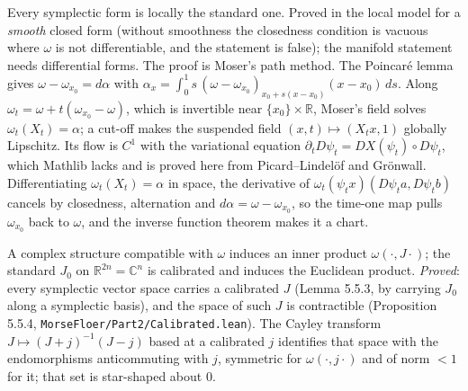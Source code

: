 \begin{theorem}
  \label{thm:5.3.2}
  \leanok
  Every symplectic form is locally the standard one.  Proved in the local model
  for a \emph{smooth} closed form (without smoothness the closedness condition is
  vacuous where $\omega$ is not differentiable, and the statement is false); the
  manifold statement needs differential forms.  The proof is Moser's path method.
  The Poincar\'e lemma gives $\omega - \omega_{x_0} = d\alpha$ with
  $\alpha_x = \int_0^1 s\,(\omega - \omega_{x_0})_{x_0 + s(x - x_0)}(x - x_0)\,ds$.
  Along $\omega_t = \omega + t(\omega_{x_0} - \omega)$, which is invertible near
  $\{x_0\}\times\mathbb{R}$, Moser's field solves $\omega_t(X_t) = \alpha$; a cut-off
  makes the suspended field $(x,t) \mapsto (X_t x, 1)$ globally Lipschitz.  Its
  flow is $C^1$ with the variational equation
  $\partial_t D\psi_t = DX(\psi_t)\circ D\psi_t$, which Mathlib lacks and is
  proved here from Picard--Lindel\"of and Gr\"onwall.  Differentiating
  $\omega_t(X_t) = \alpha$ in space, the derivative of
  $\omega_t(\psi_t x)(D\psi_t a, D\psi_t b)$ cancels by closedness, alternation and
  $d\alpha = \omega - \omega_{x_0}$, so the time-one map pulls $\omega_{x_0}$ back to
  $\omega$, and the inverse function theorem makes it a chart.
\end{theorem}

\begin{proposition}
  \label{prop:5.5}
  \leanok
  A complex structure compatible with $\omega$ induces an inner product
  $\omega(\cdot,J\cdot)$; the standard $J_0$ on $\mathbb{R}^{2n}=\mathbb{C}^n$ is
  calibrated and induces the Euclidean product.  \emph{Proved}: every symplectic
  vector space carries a calibrated $J$ (Lemma 5.5.3, by carrying $J_0$ along a
  symplectic basis), and the space of such $J$ is contractible (Proposition
  5.5.4, \texttt{MorseFloer/Part2/Calibrated.lean}).  The Cayley transform
  $J \mapsto (J+j)^{-1}(J-j)$ based at a calibrated $j$ identifies that space
  with the endomorphisms anticommuting with $j$, symmetric for
  $\omega(\cdot, j\cdot)$ and of norm $<1$ for it; that set is star-shaped
  about $0$.
\end{proposition}

